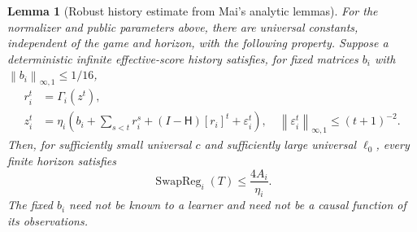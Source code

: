 \documentclass[11pt]{article}
\newcommand{\SwapReg}{\operatorname{SwapReg}}
\newcommand{\norm}[1]{\left\lVert#1\right\rVert}
\newcommand{\rn}[1]{\norm{#1}_{\infty,1}}
\newcommand{\Pred}{\mathsf H}
\newtheorem{lemma}[theorem]{Lemma}
\begin{document}
\begin{lemma}[Robust history estimate from Mai's analytic lemmas]\label{lem:history}
For the normalizer and public parameters above, there are universal
constants, independent of the game and horizon, with the following
property.  Suppose a deterministic infinite effective-score history
satisfies, for fixed matrices $b_i$ with $\rn{b_i}\leq1/16$,
\begin{align}
 r_i^t&=\Gamma_i(z^t),\label{eq:truehistory}\\
 z_i^t&=\eta_i\left(b_i+\sum_{s<t}r_i^s
                 +(I-\Pred)[r_i]^t+\varepsilon_i^t\right),
 \quad\rn{\varepsilon_i^t}\leq(t+1)^{-2}.
 \label{eq:history}
\end{align}
Then, for sufficiently small universal $c$ and sufficiently large
universal $\ell_0$, every finite horizon satisfies
\begin{equation}\label{eq:inputconclusion}
 \SwapReg_i(T)\leq \frac{4A_i}{\eta_i}.
\end{equation}
The fixed $b_i$ need not be known to a learner and need not be a causal
function of its observations.
\end{lemma}
\end{document}
